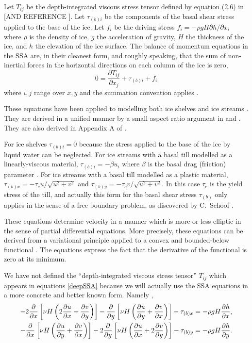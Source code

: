 \documentclass[12pt]{amsart}%
\theoremstyle{plain}
\theoremstyle{definition}
\newcommand{\ddx}[1]{\ensuremath{\frac{\partial #1}{\partial x}}}
\newcommand{\ddy}[1]{\ensuremath{\frac{\partial #1}{\partial y}}}
\begin{document}
Let $T_{ij}$ be the depth-integrated viscous stress tensor defined by equation (2.6) in \cite{SchoofStream} [AND REFERENCE \cite{Morland}].  Let $\tau_{(b)i}$ be the components of the basal shear stress applied to the base of the ice.  Let $f_i$ be the driving stress $f_i = - \rho g H \partial h/\partial x_i$ where $\rho$ is the density of ice, $g$ the acceleration of gravity, $H$ the thickness of the ice, and $h$ the elevation of the ice surface.  The balance of momentum equations in the SSA are, in their cleanest form, and roughly speaking, that the sum of non-inertial forces in the horizontal directions on each column of the ice is zero,
\begin{equation}\label{deepSSA}
  0 = \frac{\partial T_{ij}}{\partial x_j} + \tau_{(b)i} + f_i
\end{equation}
where $i,j$ range over $x,y$ and the summation convention applies \cite{SchoofStream}.

These equations have been applied to modelling both ice shelves \cite{MacAyealetal} and ice streams \cite{MacAyeal}.  They are derived in a unified manner by a small aspect ratio argument in \cite{Morland} and \cite{WeisGreveHutter}.  They are also derived in Appendix A of \cite{SchoofStream}.

For ice shelves $\tau_{(b)i} = 0$ because the stress applied to the base of the ice by liquid water can be neglected.  For ice streams with a basal till modelled as a linearly-viscous material, $\tau_{(b)i} = - \beta u_i$ where $\beta$ is the basal drag (friction) parameter \cite{HulbeMacAyeal,MacAyeal}.  For ice streams with a basal till modelled as a plastic material, $\tau_{(b)x} = - \tau_c u/\sqrt{u^2 + v^2}$ and $\tau_{(b)y} = - \tau_c v/\sqrt{u^2 + v^2}$.  In this case $\tau_c$ is the yield stress of the till, and actually this form for the basal shear stress $\tau_{(b)}$ only applies in the sense of a free boundary problem, as discovered by C.~Schoof \cite{SchoofStream}.

These equations determine velocity in a manner which is more-or-less elliptic in the sense of partial differential equations.  More precisely, these equations can be derived from a variational principle applied to a convex and bounded-below functional \cite{SchoofStream}.  The equations express the fact that the derivative of the functional is zero at its minimum.

We have not defined the ``depth-integrated viscous stress tensor'' $T_{ij}$ which appears in equations \eqref{deepSSA} because we will actually use the SSA equations in a more concrete and better known form.  Namely \cite{HulbeMacAyeal,Morland,SchoofStream},
\begin{align}\label{SSA}
 - 2 \ddx{}\left[\nu H \left(2 \ddx{u} + \ddy{v}\right)\right]
 - \ddy{}\left[\nu H \left(\ddy{u} + \ddx{v}\right)\right] - \tau_{(b)x}
        &= - \rho g H \frac{\partial h}{\partial x}, \\
 - \ddx{}\left[\nu H \left(\ddy{u} + \ddx{v}\right)\right]
 - 2 \ddy{}\left[\nu H \left(\ddx{u} + 2 \ddy{v}\right)\right] - \tau_{(b)y}
        &= - \rho g H \frac{\partial h}{\partial y}.\notag
\end{align}
\end{document}
